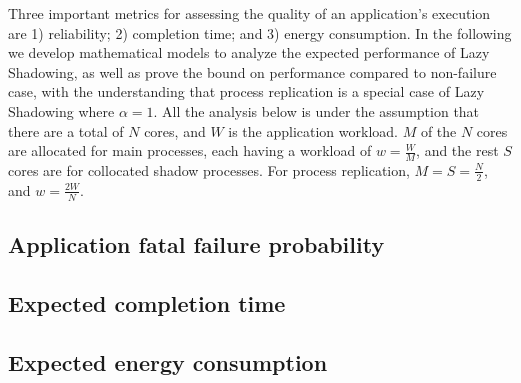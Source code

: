 Three important metrics for assessing the quality of an application's execution are 1) reliability; 2) completion time; and 3) energy consumption. In the following we develop mathematical models to analyze the expected performance of Lazy Shadowing, as well as prove the bound on performance compared to non-failure case, with the understanding
that process replication is a special case of Lazy Shadowing where $\alpha=1$. 
All the analysis below is under the assumption that there are a total of $N$ cores, and $W$ is the application workload.  
$M$ of the $N$ cores are allocated for main processes, each having a workload of $w=\frac{W}{M}$, and the rest $S$ cores are for collocated shadow processes. For process replication,
$M=S=\frac{N}{2}$, and $w=\frac{2W}{N}$. 


\subsection{Application fatal failure probability}
\label{anal_app_fail}


\subsection{Expected completion time}
\label{anal_time}


\subsection{Expected energy consumption}
\label{anal_energy}

